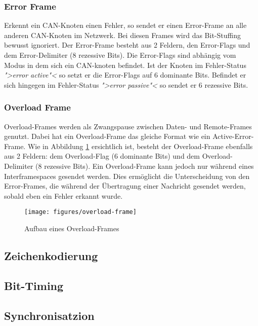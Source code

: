 \subsubsection{Error Frame} Erkennt ein CAN-Knoten einen Fehler, so
sendet er einen Error-Frame an alle anderen CAN-Knoten im Netzwerk.
Bei diesen Frames wird das Bit-Stuffing bewusst ignoriert. Der
Error-Frame besteht aus 2 Feldern, den Error-Flags und dem
Error-Delimiter (8 rezessive Bits). Die Error-Flags sind abhängig vom
Modus in dem sich ein CAN-knoten befindet. Ist der Knoten im
Fehler-Status \textit{">error active"<} so setzt er die Error-Flags
auf 6 dominante Bits. Befindet er sich hingegen im Fehler-Status
\textit{">error passive"<} so sendet er 6 rezessive Bits.
	
\subsubsection{Overload Frame} Overload-Frames werden als Zwangspause
zwischen Daten- und Remote-Frames genutzt. Dabei hat ein
Overload-Frame das gleiche Format wie ein Active-Error-Frame. Wie in
Abbildung \ref{overload} ersichtlich ist, besteht der Overload-Frame
ebenfalls aus 2 Feldern: dem Overload-Flag (6 dominante Bits) und dem
Overload-Delimiter (8 rezessive Bits). Ein Overload-Frame kann jedoch
nur während eines Interframespaces gesendet werden. Dies ermöglicht
die Unterscheidung von den Error-Frames, die während der Übertragung
einer Nachricht gesendet werden, sobald eben ein Fehler erkannt wurde.

	
\begin{figure}[h] 
\centering
\texttt{[image: figures/overload-frame]}
\caption{Aufbau eines Overload-Frames \citep{CBM}} 
\label{overload}
\end{figure} 
	
	\subsection{Zeichenkodierung}
	
	\subsection{Bit-Timing}
	
	\subsection{Synchronisatzion}
	

